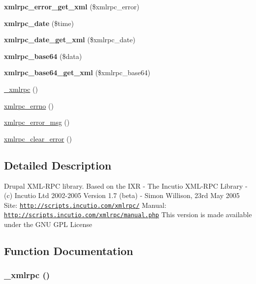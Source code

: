 \begin{CompactItemize}
\item 
\hypertarget{xmlrpc_8inc_aca4578f8a9f0c150c056f61aa62e806}{
\textbf{xmlrpc\_\-error\_\-get\_\-xml} (\$xmlrpc\_\-error)}
\label{xmlrpc_8inc_aca4578f8a9f0c150c056f61aa62e806}

\item 
\hypertarget{xmlrpc_8inc_16688c083542abbf89dfd3fc63907c76}{
\textbf{xmlrpc\_\-date} (\$time)}
\label{xmlrpc_8inc_16688c083542abbf89dfd3fc63907c76}

\item 
\hypertarget{xmlrpc_8inc_ad3285fb3322b9452fc7b77acf4e608c}{
\textbf{xmlrpc\_\-date\_\-get\_\-xml} (\$xmlrpc\_\-date)}
\label{xmlrpc_8inc_ad3285fb3322b9452fc7b77acf4e608c}

\item 
\hypertarget{xmlrpc_8inc_0a49b5ffbb4c8e76bc96c2bc7b8d22dc}{
\textbf{xmlrpc\_\-base64} (\$data)}
\label{xmlrpc_8inc_0a49b5ffbb4c8e76bc96c2bc7b8d22dc}

\item 
\hypertarget{xmlrpc_8inc_d45673fd18d893a23b7b77d0c67f7b4a}{
\textbf{xmlrpc\_\-base64\_\-get\_\-xml} (\$xmlrpc\_\-base64)}
\label{xmlrpc_8inc_d45673fd18d893a23b7b77d0c67f7b4a}

\item 
\hyperlink{xmlrpc_8inc_97482d1fad1e8038981113d5b2ca981a}{\_\-xmlrpc} ()
\item 
\hyperlink{xmlrpc_8inc_f9d29505279c00e66545f3859550ff88}{xmlrpc\_\-errno} ()
\item 
\hyperlink{xmlrpc_8inc_baf990108687e6e764164984306dbd55}{xmlrpc\_\-error\_\-msg} ()
\item 
\hyperlink{xmlrpc_8inc_fa5cac64bc9057f6ac904b870d9c1311}{xmlrpc\_\-clear\_\-error} ()
\end{CompactItemize}


\subsection{Detailed Description}
Drupal XML-RPC library. Based on the IXR - The Incutio XML-RPC Library - (c) Incutio Ltd 2002-2005 Version 1.7 (beta) - Simon Willison, 23rd May 2005 Site: \href{http://scripts.incutio.com/xmlrpc/}{\tt http://scripts.incutio.com/xmlrpc/} Manual: \href{http://scripts.incutio.com/xmlrpc/manual.php}{\tt http://scripts.incutio.com/xmlrpc/manual.php} This version is made available under the GNU GPL License 

\subsection{Function Documentation}
\hypertarget{xmlrpc_8inc_97482d1fad1e8038981113d5b2ca981a}{
\subsubsection[{\_\-xmlrpc}]{\setlength{\rightskip}{0pt plus 5cm}\_\-xmlrpc ()}}
\label{xmlrpc_8inc_97482d1fad1e8038981113d5b2ca981a}


